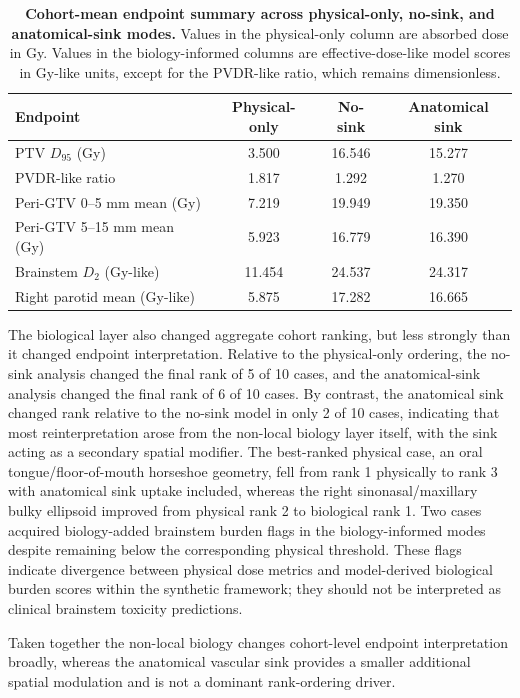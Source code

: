 \documentclass[10pt,a4paper]{article}
\begin{document}
\begin{table}[H]
\centering
\caption{\textbf{Cohort-mean endpoint summary across physical-only, no-sink, and anatomical-sink modes.} Values in the physical-only column are absorbed dose in Gy. Values in the biology-informed columns are effective-dose-like model scores in Gy-like units, except for the PVDR-like ratio, which remains dimensionless.}
\label{tab:endpoints}
\footnotesize
\begin{tabular}{lccc}
\toprule
Endpoint & Physical-only & No-sink & Anatomical sink \\
\midrule
PTV $D_{95}$ (Gy) & 3.500 & 16.546 & 15.277 \\
PVDR-like ratio & 1.817 & 1.292 & 1.270 \\
Peri-GTV 0--5 mm mean (Gy) & 7.219 & 19.949 & 19.350 \\
Peri-GTV 5--15 mm mean (Gy) & 5.923 & 16.779 & 16.390 \\
Brainstem $D_{2}$ (Gy-like) & 11.454 & 24.537 & 24.317 \\
Right parotid mean (Gy-like) & 5.875 & 17.282 & 16.665 \\
\bottomrule
\end{tabular}
\end{table}

The biological layer also changed aggregate cohort ranking, but less strongly than it changed endpoint interpretation. Relative to the physical-only ordering, the no-sink analysis changed the final rank of 5 of 10 cases, and the anatomical-sink analysis changed the final rank of 6 of 10 cases. By contrast, the anatomical sink changed rank relative to the no-sink model in only 2 of 10 cases, indicating that most reinterpretation arose from the non-local biology layer itself, with the sink acting as a secondary spatial modifier. The best-ranked physical case, an oral tongue/floor-of-mouth horseshoe geometry, fell from rank 1 physically to rank 3 with anatomical sink uptake included, whereas the right sinonasal/maxillary bulky ellipsoid improved from physical rank 2 to biological rank 1. Two cases acquired biology-added brainstem burden flags in the biology-informed modes despite remaining below the corresponding physical threshold. These flags indicate divergence between physical dose metrics and model-derived biological burden scores within the synthetic framework; they should not be interpreted as clinical brainstem toxicity predictions.

Taken together the non-local biology changes cohort-level endpoint interpretation broadly, whereas the anatomical vascular sink provides a smaller additional spatial modulation and is not a dominant rank-ordering driver. 
\end{document}
